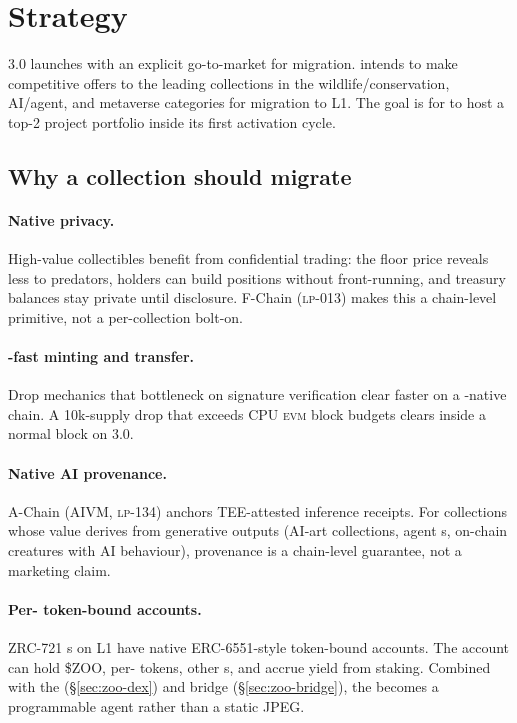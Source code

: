 \section{\NFT{} Strategy}
\label{sec:nft-strategy}

\Zoo{} 3.0 launches with an explicit go-to-market for \NFT{} migration.
\Zoo{} intends to make competitive offers to the leading \NFT{}
collections in the wildlife/conservation, AI/agent, and metaverse
categories for migration to \Zoo{} L1. The goal is for \Zoo{} to host a
top-2 \NFT{} project portfolio inside its first activation cycle.

\subsection{Why a collection should migrate}

\paragraph{Native \FHE{} privacy.}
High-value collectibles benefit from confidential trading: the floor
price reveals less to predators, holders can build positions without
front-running, and treasury balances stay private until disclosure.
F-Chain (\textsc{lp-013}) makes this a chain-level primitive, not a
per-collection bolt-on.

\paragraph{\GPU{}-fast minting and transfer.}
Drop mechanics that bottleneck on signature verification clear faster
on a \GPU{}-native chain. A 10k-supply drop that exceeds CPU \textsc{evm}
block budgets clears inside a normal block on \Zoo{} 3.0.

\paragraph{Native AI provenance.}
A-Chain (AIVM, \textsc{lp-134}) anchors TEE-attested inference
receipts. For collections whose value derives from generative outputs
(AI-art collections, agent \NFT{}s, on-chain creatures with AI
behaviour), provenance is a chain-level guarantee, not a marketing
claim.

\paragraph{Per-\NFT{} token-bound accounts.}
ZRC-721 \NFT{}s on \Zoo{} L1 have native ERC-6551-style token-bound
accounts. The account can hold \$ZOO, per-\LLM{} tokens, other
\NFT{}s, and accrue yield from staking. Combined with the \Zoo{} \DEX{}
(\S\ref{sec:zoo-dex}) and bridge (\S\ref{sec:zoo-bridge}), the \NFT{}
becomes a programmable agent rather than a static JPEG.

